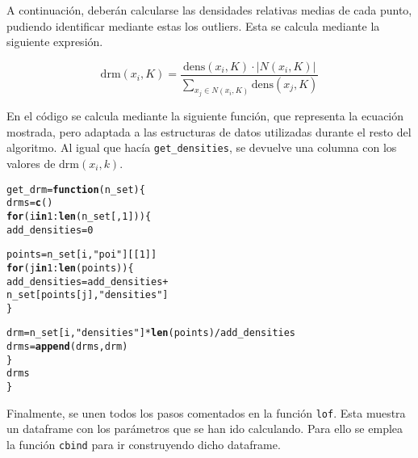 \documentclass[12pt]{report}\usepackage[]{graphicx}\usepackage[dvipsnames]{xcolor}
\makeatletter
\newcommand{\hlnum}[1]{\textcolor[rgb]{0.686,0.059,0.569}{#1}}%
\newcommand{\hlstr}[1]{\textcolor[rgb]{0.192,0.494,0.8}{#1}}%
\newcommand{\hlopt}[1]{\textcolor[rgb]{0,0,0}{#1}}%
\newcommand{\hlstd}[1]{\textcolor[rgb]{0.345,0.345,0.345}{#1}}%
\newcommand{\hlkwa}[1]{\textcolor[rgb]{0.161,0.373,0.58}{\textbf{#1}}}%
\newcommand{\hlkwb}[1]{\textcolor[rgb]{0.69,0.353,0.396}{#1}}%
\newcommand{\hlkwc}[1]{\textcolor[rgb]{0.333,0.667,0.333}{#1}}%
\newcommand{\hlkwd}[1]{\textcolor[rgb]{0.737,0.353,0.396}{\textbf{#1}}}%
\newenvironment{kframe}{%
 \def\at@end@of@kframe{}%
 \ifinner\ifhmode%
  \def\at@end@of@kframe{\end{minipage}}%
  \begin{minipage}{\columnwidth}%
 \fi\fi%
 \def\FrameCommand##1{\hskip\@totalleftmargin \hskip-\fboxsep
 \colorbox{shadecolor}{##1}\hskip-\fboxsep
     \hskip-\linewidth \hskip-\@totalleftmargin \hskip\columnwidth}%
 \MakeFramed {\advance\hsize-\width
   \@totalleftmargin\z@ \linewidth\hsize
   \@setminipage}}%
 {\par\unskip\endMakeFramed%
 \at@end@of@kframe}
\newenvironment{knitrout}{}{} %
\newcommand{\ds}{\text{dens}}
\newcommand{\drm}{\text{drm}}
\makeatother
\begin{document}
					A continuación, deberán calcularse las densidades relativas medias de cada punto, pudiendo identificar mediante estas los outliers. Esta se calcula mediante la siguiente expresión. 
					
					$$
					\drm(x_i, K) = \frac{\ds(x_i, K) \cdot |N(x_i, K)|}{\displaystyle\sum_{x_j \in N(x_i, K)}\ds(x_j, K)}
					$$
					
					En el código se calcula mediante la siguiente función, que representa la ecuación mostrada, pero adaptada a las estructuras de datos utilizadas durante el resto del algoritmo. Al igual que hacía \texttt{get\_densities}, se devuelve una columna con los valores de $\drm(x_i, k)$. 
					
\begin{knitrout}
\color{fgcolor}\begin{kframe}
\begin{alltt}
\hlstd{get_drm} \hlkwb{=} \hlkwa{function}\hlstd{(}\hlkwc{n_set}\hlstd{) \{}
        \hlstd{drms} \hlkwb{=} \hlkwd{c}\hlstd{()}
        \hlkwa{for} \hlstd{(i} \hlkwa{in} \hlnum{1}\hlopt{:}\hlkwd{len}\hlstd{(n_set[,}\hlnum{1}\hlstd{])) \{}
                \hlstd{add_densities} \hlkwb{=} \hlnum{0}

                \hlstd{points} \hlkwb{=} \hlstd{n_set[i,} \hlstr{"poi"}\hlstd{][[}\hlnum{1}\hlstd{]]}
                \hlkwa{for} \hlstd{(j} \hlkwa{in} \hlnum{1}\hlopt{:}\hlkwd{len}\hlstd{(points)) \{}
                        \hlstd{add_densities} \hlkwb{=} \hlstd{add_densities} \hlopt{+}
                                \hlstd{n_set[points[j],} \hlstr{"densities"}\hlstd{]}
                \hlstd{\}}

                \hlstd{drm} \hlkwb{=} \hlstd{n_set[i,} \hlstr{"densities"}\hlstd{]} \hlopt{*} \hlkwd{len}\hlstd{(points)} \hlopt{/} \hlstd{add_densities}
                \hlstd{drms} \hlkwb{=} \hlkwd{append}\hlstd{(drms, drm)}
        \hlstd{\}}
        \hlstd{drms}
\hlstd{\}}
\end{alltt}
\end{kframe}
\end{knitrout}
					
					Finalmente, se unen todos los pasos comentados en la función \texttt{lof}. Esta muestra un dataframe con los parámetros que se han ido calculando. Para ello se emplea la función \texttt{cbind} para ir construyendo dicho dataframe. 
					
\end{document}
